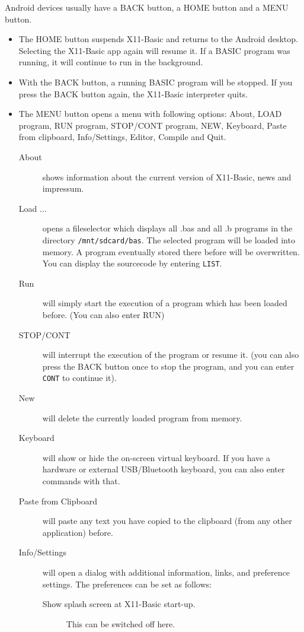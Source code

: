 Android devices usually have a BACK button, a HOME button and a MENU button. 
\begin{itemize}
\item The HOME button suspends X11-Basic and returns to the Android desktop. 
      Selecting the X11-Basic app again will resume it. If a BASIC 
      program was running, it will continue to run in the background.
\item With the BACK button, a running BASIC program will be stopped. 
      If you press the BACK button again, the X11-Basic interpreter quits.
\item The MENU button opens a menu with following options: About, LOAD program,
      RUN program, STOP/CONT program, NEW, Keyboard, Paste from clipboard, 
      Info/Settings, Editor, Compile and Quit.
\begin{description}
\item[About] shows information about the current version of X11-Basic, news and 
             impressum.
\item[Load ...] opens a fileselector which displays all .bas and all .b 
                programs in the directory \verb|/mnt/sdcard/bas|. 
		The selected program will be loaded into memory. A program 
		eventually stored there before will be overwritten. You can 
		display the sourcecode by entering \verb|LIST|.
\item[Run] will simply start the execution of a program which has been 
             loaded before. (You can also enter RUN)
\item[STOP/CONT] will interrupt the execution of the program or resume it. 
                 (you can also press the BACK button once to stop the program, 
		 and you can enter \verb|CONT| to continue it).
\item[New]      will delete the currently loaded program from memory.
\item[Keyboard] will show or hide the on-screen virtual keyboard. If you have 
                a hardware or external USB/Bluetooth keyboard, you can also 
		enter commands with that.
\item[Paste from Clipboard] will paste any text you have copied to the 
                            clipboard (from any other application) before.
\item[Info/Settings] will open a dialog with additional information, links, 
and preference settings. The preferences can be set as follows:
\begin{description}
\item[Show splash screen at X11-Basic start-up.] This can be switched off here.

\end{description}
\end{description}
\end{itemize}

